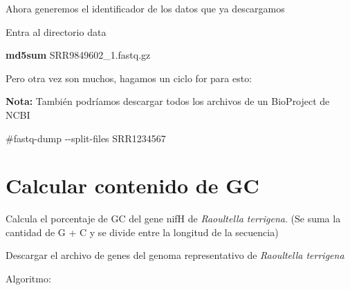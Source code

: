 \documentclass[
]{book}
\newenvironment{Shaded}{\begin{snugshade}}{\end{snugshade}}
\newcommand{\ControlFlowTok}[1]{\textcolor[rgb]{0.13,0.29,0.53}{\textbf{#1}}}
\newcommand{\FunctionTok}[1]{\textcolor[rgb]{0.13,0.29,0.53}{\textbf{#1}}}
\newcommand{\KeywordTok}[1]{\textcolor[rgb]{0.13,0.29,0.53}{\textbf{#1}}}
\newcommand{\NormalTok}[1]{#1}
\newcommand{\PreprocessorTok}[1]{\textcolor[rgb]{0.56,0.35,0.01}{\textit{#1}}}
\newcommand{\VariableTok}[1]{\textcolor[rgb]{0.00,0.00,0.00}{#1}}
\begin{document}
Ahora generemos el identificador de los datos que ya descargamos

Entra al directorio data

\begin{Shaded}
\begin{Highlighting}[]
\FunctionTok{md5sum}\NormalTok{ SRR9849602\_1.fastq.gz}
\end{Highlighting}
\end{Shaded}

Pero otra vez son muchos, hagamos un ciclo for para esto:

\begin{Shaded}
\end{Shaded}

\textbf{Nota:} También podríamos descargar todos los archivos de un BioProject de NCBI

\begin{Shaded}
\begin{Highlighting}[]
\NormalTok{\#fastq{-}dump {-}{-}split{-}files SRR1234567}
\end{Highlighting}
\end{Shaded}

\section{Calcular contenido de GC}\label{calcular-contenido-de-gc}

Calcula el porcentaje de GC del gene nifH de \emph{Raoultella terrigena}. (Se suma la cantidad de G + C y se divide entre la longitud de la secuencia)

Descargar el archivo de genes del genoma representativo de \emph{Raoultella terrigena}

Algoritmo:
\end{document}
